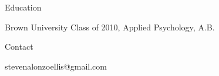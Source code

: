 \documentclass[12pt]{res}
\begin{document}
{\begin{resume}
\begin{minipage}{7.6in}
\begin{list}{}{\leftmargin=0em}
\item{Education\dotfill 
\begin{list}{-}{\leftmargin=1em}
\item Brown University Class of 2010, Applied Psychology, A.B.
\end{list}}

\item{Contact\dotfill 
\begin{list}{-}{\leftmargin=1em}
\item stevenalonzoellis@gmail.com
\end{list}}
\end{list}
\vspace{35mm}
\vspace{34mm}
\end{minipage}
\end{resume}
} %
\end{document}
